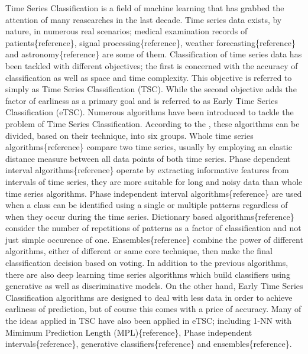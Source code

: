 Time Series Classification is a field of machine learning that has grabbed the attention of many reasearches in the last decade.
Time series data exists, by nature, in numerous real scenarios; medical examination records of patients\{reference\}, signal processing\{reference\}, weather forecasting\{reference\} and astronomy\{reference\} are some of them.\newline
Classification of time series data has been tackled with different objectives; the first is concerned with the accuracy of classification as well as space and time complexity. This objective is referred to simply as Time Series Classification (TSC). While the second objective adds the factor of earliness as a primary goal and is referred to as Early Time Series Classification (eTSC).\newline
Numerous algorithms have been introduced to tackle the problem of Time Series Classification. According to the \cite{bagnall2017great}, these algorithms can be divided, based on their technique, into six groups.\newline
Whole time series algorithms\{reference\} compare two time series, usually by employing an elastic distance measure between all data points of both time series.
Phase dependent interval algorithms\{reference\} operate by extracting informative features from intervals of time series, they are more suitable for long and noisy data than whole time series algorithms.
Phase independent interval algorithms\{reference\} are used when a class can be identified using a single or multiple patterns regardless of when they occur during the time series.
Dictionary based algorithms\{reference\} consider the number of repetitions of patterns as a factor of classification and not just simple occurence of one.
Ensembles\{reference\} combine the power of different algorithms, either of different or same core technique, then make the final classification decision based on voting.
In addition to the previous algorithms, there are also deep learning time series algorithms which build classifiers using generative as well as discriminative models.\newline
On the other hand, Early Time Series Classification algorithms are designed to deal with less data in order to achieve earliness of prediction, but of course this comes with a price of accuracy.
Many of the ideas applied in TSC have also been applied in eTSC; including 1-NN with Mimimum Prediction Length (MPL)\{reference\}, Phase independent intervals\{reference\}, generative classifiers\{reference\} and ensembles\{reference\}.\newline


